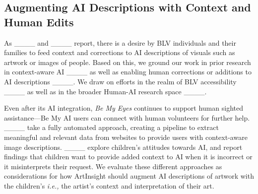 \subsection{Augmenting AI Descriptions with Context and Human Edits}
As ____ and ____ report, there is a desire by BLV individuals and their families to feed context and corrections to AI descriptions of visuals such as artwork or images of people. Based on this, we ground our work in prior research in context-aware AI ____ as well as enabling human corrections or additions to AI descriptions ____. We draw on efforts in the realm of BLV accessibility ____ as well as in the broader Human-AI research space ____.

Even after its AI integration, \textit{Be My Eyes} continues to support human sighted assistance---Be My AI users can connect with human volunteers for further help. ____ take a fully automated approach, creating a pipeline to extract meaningful and relevant data from websites to provide users with context-aware image descriptions. ____ explore children's attitudes towards AI, and report findings that children want to provide added context to AI when it is incorrect or it misinterprets their request. We evaluate these different approaches as considerations for how ArtInsight should augment AI descriptions of artwork with the children's \textit{i.e.,} the artist's context and interpretation of their art.